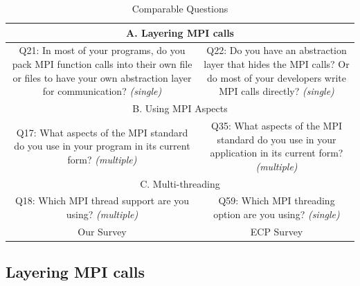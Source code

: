 \documentclass[conference,10pt,letterpaper]{IEEEtran}
\begin{document}
\begin{table}[htb]%
\begin{center}%
  \caption{Comparable Questions}%
  \label{tab:comparable-questions}%
  \begin{tabular}[t]{c|c}
    \hline
    \multicolumn{2}{c}{A. Layering MPI calls} \\
    \hline
    \begin{minipage}[t]{0.45\hsize}
      Q21: In most of your programs, do you pack MPI function calls into
      their own file or files to have your own abstraction layer for
      communication?  {\it(single)}
    \end{minipage}
    &
    \begin{minipage}[t]{0.45\hsize}
      Q22: Do you have an abstraction layer that hides the MPI calls? Or do
      most of your developers write MPI calls directly? {\it(single)}
    \end{minipage}
    \\
    \hline
    \multicolumn{2}{c}{B. Using MPI Aspects} \\
    \hline
    \begin{minipage}[t]{0.45\hsize}
      Q17: What aspects of the MPI standard do you use in your program in its
      current form? {\it(multiple)}
    \end{minipage}
    &
    \begin{minipage}[t]{0.45\hsize}
      Q35: What aspects of the MPI standard do you use in your application in
      its current form? {\it(multiple)}
    \end{minipage}
    \\
    \hline
    \multicolumn{2}{c}{C. Multi-threading} \\
    \hline
    \begin{minipage}[t]{0.45\hsize}
      Q18: Which MPI thread support are you using? {\it(multiple)}
    \end{minipage}
    &
    \begin{minipage}[t]{0.45\hsize}
      Q59: Which MPI threading option are you using? {\it(single)}
    \end{minipage}
    \\
    \hline
    Our Survey & ECP Survey \\
    \hline
  \end{tabular}%
\end{center}%
\end{table}%

\subsection{Layering MPI calls}
\end{document}
